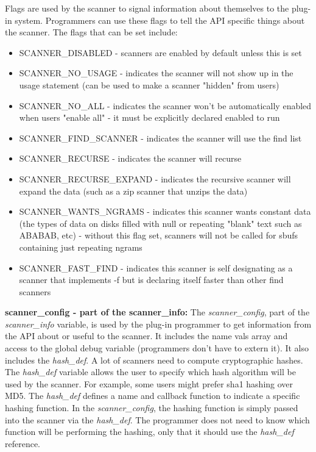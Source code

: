 \documentclass[11pt,fleqn]{article} %
\begin{document}
Flags are used by the scanner to signal information about themselves to the plug-in system. Programmers can use these flags to tell the API specific things about the scanner. The flags that can be set include: 
\begin{itemize}
\item SCANNER\_DISABLED - scanners are enabled by default unless this is set
\item SCANNER\_NO\_USAGE - indicates the scanner will not show up in the usage statement (can be used to make a 
scanner "hidden" from \bulk users)
\item SCANNER\_NO\_ALL - indicates the scanner won't be automatically enabled when users "enable all" - it must be explicitly declared enabled to run
\item SCANNER\_FIND\_SCANNER - indicates the scanner will use the find list
\item SCANNER\_RECURSE - indicates the scanner will recurse
\item SCANNER\_RECURSE\_EXPAND - indicates the recursive scanner will expand the data (such as a zip scanner that unzips the data)
\item SCANNER\_WANTS\_NGRAMS - indicates this scanner wants constant data (the types of data on disks filled with null or repeating "blank" text such as ABABAB, etc) - without this flag set, scanners will not be called for sbufs containing just repeating ngrams
\item SCANNER\_FAST\_FIND - indicates this scanner is self designating as a scanner that implements -f but is declaring itself faster than other find scanners  
\end{itemize}

\textbf{scanner\_config - part of the scanner\_info:}
The \textit{scanner\_config}, part of the \textit{scanner\_info} variable, is used by the plug-in programmer to get information from the API about or useful to the scanner. It includes the name vals array and access to the global debug variable (programmers don't have to extern it). It also includes the \textit{hash\_def}.  A lot of scanners need to compute cryptographic hashes. The \textit{hash\_def} variable allows the \bulk user to specify which hash algorithm will be used by the scanner. For example, some users might prefer sha1 hashing over MD5. The \textit{hash\_def} defines a name and callback function to indicate a specific hashing function. In the \textit{scanner\_config}, the hashing function is simply passed into the scanner via the \textit{hash\_def}. The programmer does not need to know which function will be performing the hashing, only that it should use the \textit{hash\_def} reference. \\ 
\end{document}
